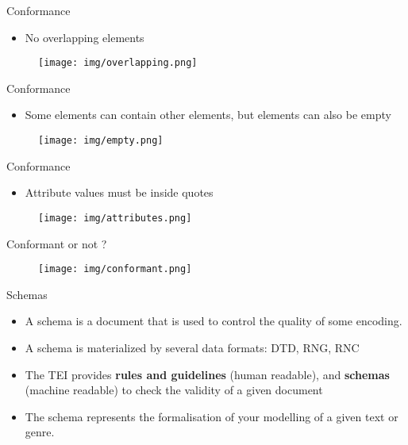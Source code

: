 \documentclass[11pt,aspectratio=1610]{beamer}
\begin{document}
\begin{frame}{Conformance}
\begin{itemize}
\item No overlapping elements
\end{itemize}
\begin{center}
\begin{figure}
\texttt{[image: img/overlapping.png]}
\end{figure}
\end{center}
\end{frame}


\begin{frame}{Conformance}
\begin{itemize}
\item Some elements can contain other elements, but elements can also be empty
\end{itemize}
\begin{center}
\begin{figure}
\texttt{[image: img/empty.png]}
\end{figure}
\end{center}
\end{frame}



\begin{frame}{Conformance}
\begin{itemize}
\item Attribute values must be inside quotes
\end{itemize}
\begin{center}
\begin{figure}
\texttt{[image: img/attributes.png]}
\end{figure}
\end{center}
\end{frame}



\begin{frame}{Conformant or not ?}
\begin{center}
\begin{figure}
\texttt{[image: img/conformant.png]}
\end{figure}
\end{center}
\end{frame}




\begin{frame}{Schemas}
\begin{itemize}
\item A schema is a document that is used to control the quality of some encoding.
\item A schema is materialized by several data formats: DTD, RNG, RNC
\item The TEI provides \textbf{rules and guidelines} (human readable), and \textbf{schemas} (machine readable) to check the validity of a given document
\item The schema represents the formalisation of your modelling of a given text or genre.
\end{itemize}
\end{frame}
\end{document}
